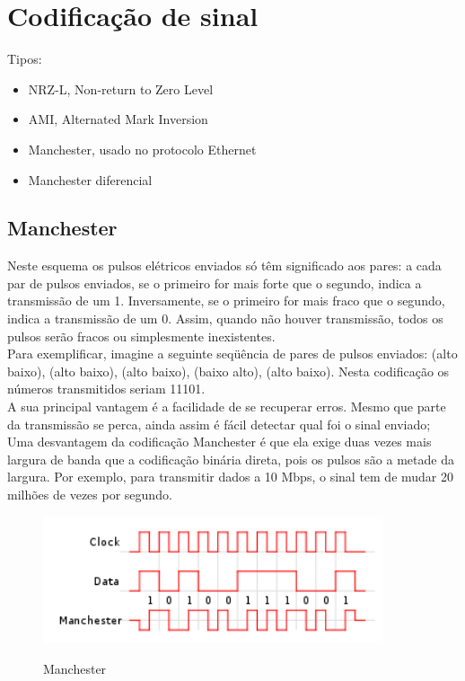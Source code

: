 \documentclass{article}
\begin{document}
\section{Codificação de sinal}

Tipos:

\begin{itemize}
	\item NRZ-L, Non-return to Zero Level
	\item AMI, Alternated Mark Inversion
	\item Manchester, usado no protocolo Ethernet
	\item Manchester diferencial
\end{itemize}

\subsection{Manchester} Neste esquema os pulsos elétricos enviados só têm
significado aos pares: a cada par de pulsos enviados, se o primeiro for mais
forte que o segundo, indica a transmissão de um 1. Inversamente, se o primeiro
for mais fraco que o segundo, indica a transmissão de um 0. Assim, quando não
houver transmissão, todos os pulsos serão fracos ou simplesmente inexistentes.\\
Para exemplificar, imagine a seguinte seqüência de pares de pulsos enviados:
(alto baixo), (alto baixo), (alto baixo), (baixo alto), (alto baixo). Nesta
codificação os números transmitidos seriam 11101.\\ A sua principal vantagem é a
facilidade de se recuperar erros. Mesmo que parte da transmissão se perca, ainda
assim é fácil detectar qual foi o sinal enviado; Uma desvantagem da codificação
Manchester é que ela exige duas vezes mais largura de banda que a codificação
binária direta, pois os pulsos são a metade da largura. Por exemplo, para
transmitir dados a 10 Mbps, o sinal tem de mudar 20 milhões de vezes por
segundo.

\begin{figure}[h]
    \center
    \includegraphics[width=10cm]{imagens/manchester.png}
    \label{manchester}
    \caption{Manchester}
\end{figure}
\end{document}
